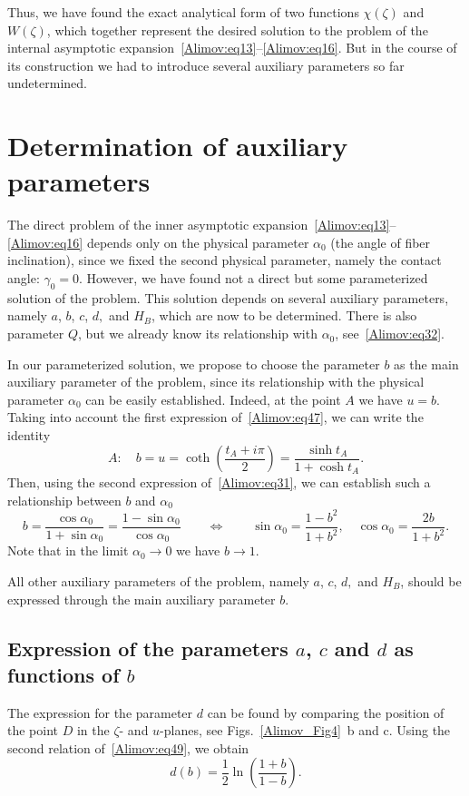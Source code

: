 \documentclass[
11pt,%
tightenlines,%
twoside,%
onecolumn,%
nofloats,%
nobibnotes,%
nofootinbib,%
superscriptaddress,%
noshowpacs,%
centertags]%
{revtex4-2}
\begin{document}
Thus, we have found the exact analytical form of two functions $\chi (\zeta)$ and $W(\zeta)$, which
together represent the desired solution to the problem of the internal asymptotic
expansion~\eqref{Alimov:eq13}--\eqref{Alimov:eq16}. But in the course of its construction we had to
introduce several auxiliary parameters so far undetermined.

\section{Determination of auxiliary parameters} \label{Alimov:sec6}
The direct problem of the inner asymptotic expansion~\eqref{Alimov:eq13}--\eqref{Alimov:eq16}
depends only on the physical parameter $\alpha_0 $ (the angle of fiber inclination), since we fixed
the second physical parameter, namely the contact angle: $\gamma _0 = 0$. However, we have found
not a direct but some parameterized solution of the problem. This solution depends on several
auxiliary parameters, namely $a$, $b$, $c$, $d,$ and $H_B$, which are now to be determined. There
is also parameter $Q$, but we already know its relationship with $\alpha_0$,
see~\eqref{Alimov:eq32}.

In our parameterized solution, we propose to choose the parameter $b$ as the main auxiliary
parameter of the problem, since its relationship with the physical parameter $\alpha_0 $ can be
easily established. Indeed, at the point $A$ we have $u = b$. Taking into account the first
expression of~\eqref{Alimov:eq47}, we can write the identity
\[
A:\quad b = u = \coth \left( {\frac{t_A + i\pi }{2}} \right) = \frac{\sinh t_A}{1 + \cosh t_A}.
\]
Then, using the second expression of~\eqref{Alimov:eq31}, we can establish such a relationship
between $b$ and $\alpha_0 $
\begin{equation}
\label{Alimov:eq58} b = \frac{\cos \alpha_0}{1 + \sin \alpha_0} = \frac{1 - \sin \alpha_0 }{\cos
\alpha_0 }\quad \quad \Leftrightarrow \quad \quad \sin \alpha_0 = \frac{1 - b^2}{1 + b^2},\quad
\cos \alpha_0 = \frac{2b}{1 + b^2}.
\end{equation}
Note that in the limit $\alpha_0 \to 0$ we have $b \to 1$.

All other auxiliary parameters of the problem, namely $a$, $c$, $d,$ and $H_B$, should be expressed
through the main auxiliary parameter $b$.

\subsection{Expression of the parameters $a$, $c$ and $d$ as functions of $b$}
The expression for the parameter $d$ can be found by comparing the position of the point $D$ in the
$\zeta$- and $u$-planes, see Figs.~\ref{Alimov_Fig4}~b and c. Using the second
relation of~\eqref{Alimov:eq49}, we obtain
\begin{equation}
\label{Alimov:eq59} d(b) = \frac{1}{2}\ln \left( {\frac{1 + b}{1 - b}} \right).
\end{equation}
\end{document}
